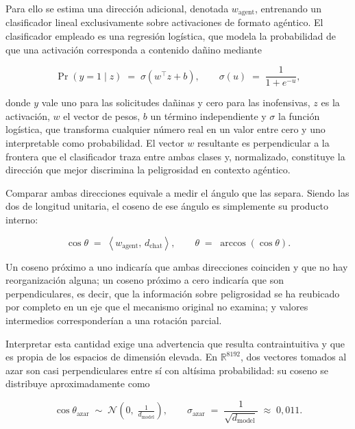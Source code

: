 Para ello se estima una dirección adicional, denotada $w_{\text{agent}}$,
entrenando un clasificador lineal exclusivamente sobre activaciones de formato
agéntico. El clasificador empleado es una regresión logística, que modela la
probabilidad de que una activación corresponda a contenido dañino mediante

\begin{equation}
  \Pr(y = 1 \mid z) \;=\; \sigma\!\left(w^{\!\top} z + b\right),
  \qquad
  \sigma(u) \;=\; \frac{1}{1 + e^{-u}},
  \label{eq:logistica}
\end{equation}

\noindent
donde $y$ vale uno para las solicitudes dañinas y cero para las inofensivas,
$z$ es la activación, $w$ el vector de pesos, $b$ un término independiente y
$\sigma$ la función logística, que transforma cualquier número real en un valor
entre cero y uno interpretable como probabilidad. El vector $w$ resultante es
perpendicular a la frontera que el clasificador traza entre ambas clases y,
normalizado, constituye la dirección que mejor discrimina la peligrosidad en
contexto agéntico.

Comparar ambas direcciones equivale a medir el ángulo que las separa. Siendo
las dos de longitud unitaria, el coseno de ese ángulo es simplemente su
producto interno:

\begin{equation}
  \cos\theta \;=\; \left\langle w_{\text{agent}},\, d_{\text{chat}}\right\rangle,
  \qquad
  \theta \;=\; \arccos\!\left(\cos\theta\right).
  \label{eq:coseno}
\end{equation}

Un coseno próximo a uno indicaría que ambas direcciones coinciden y que no hay
reorganización alguna; un coseno próximo a cero indicaría que son
perpendiculares, es decir, que la información sobre peligrosidad se ha
reubicado por completo en un eje que el mecanismo original no examina; y
valores intermedios corresponderían a una rotación parcial.

Interpretar esta cantidad exige una advertencia que resulta contraintuitiva y
que es propia de los espacios de dimensión elevada. En $\mathbb{R}^{8192}$, dos
vectores tomados al azar son casi perpendiculares entre sí con altísima
probabilidad: su coseno se distribuye aproximadamente como

\begin{equation}
  \cos\theta_{\text{azar}} \;\sim\; \mathcal{N}\!\left(0,\; \tfrac{1}{d_{\text{model}}}\right),
  \qquad
  \sigma_{\text{azar}} \;=\; \frac{1}{\sqrt{d_{\text{model}}}} \;\approx\; 0{,}011.
  \label{eq:coseno-azar}
\end{equation}

